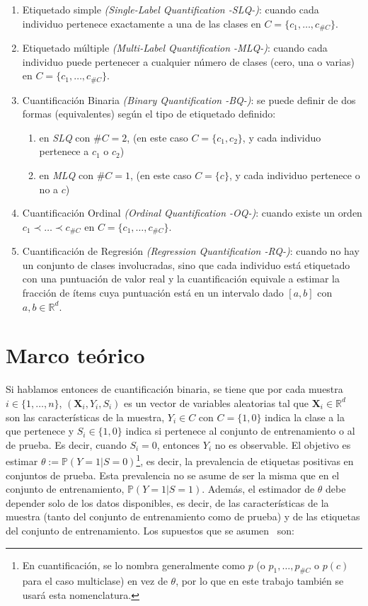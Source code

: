 \begin{enumerate}
    \item Etiquetado simple {\it (Single-Label Quantification -SLQ-)\/}: cuando
    cada individuo pertenece exactamente a una de las clases en
    $C=\{c_1,\dots,c_{\#C}\}$.
    \item Etiquetado múltiple {\it (Multi-Label Quantification -MLQ-)\/}: cuando
    cada individuo puede pertenecer a cualquier número de clases (cero, una o
    varias) en $C=\{c_1,\dots,c_{\#C}\}$.
    \item Cuantificación Binaria {\it (Binary Quantification -BQ-)\/}: se puede
    definir de dos formas (equivalentes) según el tipo de etiquetado definido:
    \begin{enumerate}
        \item en {\it SLQ\/} con $\#C=2$, (en este caso $C=\{c_1,c_2\}$, y cada
        individuo pertenece a $c_1$ o $c_2$)
        \item en {\it MLQ\/} con $\#C=1$, (en este caso $C=\{c\}$, y cada
        individuo pertenece o no a $c$)
    \end{enumerate}
    \item Cuantificación Ordinal {\it (Ordinal Quantification -OQ-)\/}: cuando
    existe un orden $c_1 \prec \dots \prec c_{\#C}$ en
    $C=\{c_1,\dots,c_{\#C}\}$.
    \item Cuantificación de Regresión {\it (Regression Quantification -RQ-)\/}:
    cuando no hay un conjunto de clases involucradas, sino que cada individuo
    está etiquetado con una puntuación de valor real y la cuantificación
    equivale a estimar la fracción de ítems cuya puntuación está en un intervalo
    dado $[a, b]$ con ${a, b \in \mathbb{R}^d}$.
\end{enumerate}

\section{Marco teórico}\label{problema:marco_teorico}

Si hablamos entonces de cuantificación binaria, se tiene que por cada muestra $i
\in \{1,\dots,n\}$, $(\boldsymbol{X}_i,Y_i,S_i)$ es un vector de variables
aleatorias tal que $\boldsymbol{X}_i \in \mathbb{R}^d$ son las características
de la muestra, $Y_i \in C$ con $C=\{1,0\}$ indica la clase a la que pertenece y
$S_i \in \{1,0\}$ indica si pertenece al conjunto de entrenamiento o al de
prueba. Es decir, cuando $S_i=0$, entonces $Y_i$ no es observable. El objetivo
es estimar $\theta:= \mathbb{P}(Y=1|S=0)$\footnote{En cuantificación, se lo
nombra generalmente como $p$ (o $p_1,\dots,p_{\#C}$ o $p(c)$ para el caso
multiclase) en vez de $\theta$, por lo que en este trabajo también se usará esta
nomenclatura.}, es decir, la prevalencia de etiquetas positivas en conjuntos de
prueba. Esta prevalencia no se asume de ser la misma que en el conjunto de
entrenamiento, $\mathbb{P}(Y=1|S=1)$. Además, el estimador de $\theta$ debe
depender solo de los datos disponibles, es decir, de las características de la
muestra (tanto del conjunto de entrenamiento como de prueba) y de las etiquetas
del conjunto de entrenamiento. Los supuestos que se
asumen~\cite{vaz2019quantification} son:

